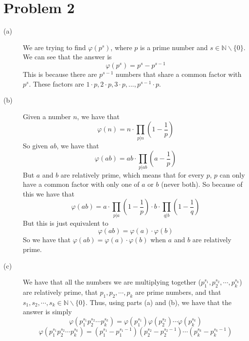 \documentclass{article}
\begin{document}
\section*{Problem 2}
\begin{description}
    \item[(a)] We are trying to find $\varphi(p^s)$, where $p$ is a prime number
        and $s \in \mathbb{N} \backslash \{0\}$. We can see that the answer is
        \[ \varphi(p^s) = p^s - p^{s-1} \]
        This is because there are $p^{s-1}$ numbers that share a common factor
        with $p^s$. These factors are $1 \cdot p, 2 \cdot p, 3 \cdot p, ...,
        p^{s-1} \cdot p$.
    \item[(b)]
        Given a number $n$, we have that
        \[ \varphi(n) = n \cdot \prod_{p|n}(1 - \frac{1}{p}) \]
        So given $ab$, we have that
        \[ \varphi(ab) = ab \cdot \prod_{p|ab}(a - \frac{1}{p}) \]
        But $a$ and $b$ are relatively prime, which means that for every $p$,
        $p$ can only have a common factor with only one of $a$ or $b$ (never
        both). So because of this we have that
        \[ \varphi(ab) = a \cdot \prod_{p|a}(1 - \frac{1}{p}) \cdot b \cdot
        \prod_{q|b}(1 - \frac{1}{q}) \]
        But this is just equivalent to
        \[ \varphi(ab) = \varphi(a) \cdot \varphi(b) \]
        So we have that $\varphi(ab) = \varphi(a) \cdot \varphi(b)$ when $a$
        and $b$ are relatively prime.
    \item[(c)]
        We have that all the numbers we are multiplying together ($p_1^{s_1},
        p_2^{s_2}, \cdots, p_k^{s_k}$) are relatively
        prime, that $p_1, p_2, \cdots, p_k$ are prime numbers, and that
        $s_1, s_2, \cdots, s_k \in \mathbb{N} \backslash \{0\}$.
        Thus, using parts (a) and (b), we have that the answer is simply
        \[ \varphi(p_1^{s_1}p_2^{s_2} \cdots p_k^{s_k}) = \varphi(p_1^{s_1})
        \varphi(p_2^{s_2}) \cdots \varphi(p_k^{s_k}) \]
        \[ \varphi(p_1^{s_1}p_2^{s_2} \cdots p_k^{s_k}) = (p_1^{s_1}-p_1^{s_1-1})
        (p_2^{s_2}-p_2^{s_2-1}) \cdots (p_k^{s_k}-p_k^{s_k-1}) \]
\end{description}

\end{document}
